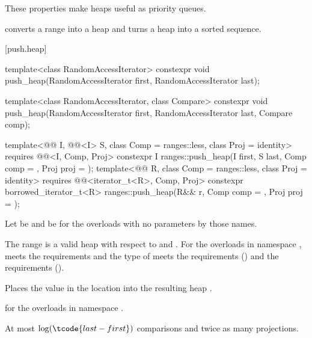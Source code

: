 \pnum
These properties make heaps useful as priority queues.

\pnum
{} converts a range into a heap and
 turns a heap into a sorted sequence.

[push.heap]{}

%
\begin{itemdecl}
template<class RandomAccessIterator>
  constexpr void push_heap(RandomAccessIterator first, RandomAccessIterator last);

template<class RandomAccessIterator, class Compare>
  constexpr void push_heap(RandomAccessIterator first, RandomAccessIterator last,
                           Compare comp);

template<@@ I, @@<I> S, class Comp = ranges::less,
         class Proj = identity>
  requires @@<I, Comp, Proj>
  constexpr I
    ranges::push_heap(I first, S last, Comp comp = {}, Proj proj = {});
template<@@ R, class Comp = ranges::less, class Proj = identity>
  requires @@<iterator_t<R>, Comp, Proj>
  constexpr borrowed_iterator_t<R>
    ranges::push_heap(R&& r, Comp comp = {}, Proj proj = {});
\end{itemdecl}

\begin{itemdescr}
\pnum
Let  be 
and  be 
for the overloads with no parameters by those names.

\pnum
\expects
The range 
is a valid heap with respect to  and .
For the overloads in namespace ,
 meets
the  requirements and
the type of  meets
the  requirements () and
the  requirements ().

\pnum
\effects
Places the value in the location 
into the resulting heap .

\pnum
\returns
{} for the overloads in namespace .

\pnum
\complexity
At most $\log(\tcode{last - first})$ comparisons and twice as many projections.
\end{itemdescr}

